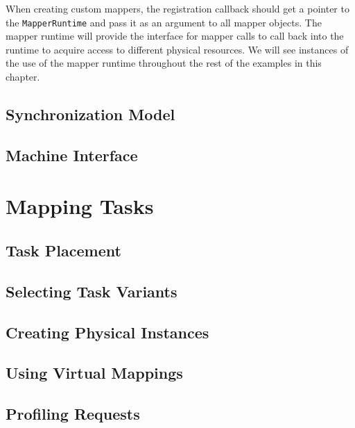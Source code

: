 When creating custom mappers, the registration callback should get a pointer
to the {\tt MapperRuntime} and pass it as an argument to all mapper objects.
The mapper runtime will provide the interface for mapper calls to call back
into the runtime to acquire access to different physical resources. We 
will see instances of the use of the mapper runtime throughout the rest of
the examples in this chapter.

\subsection{Synchronization Model}
\label{subsec:mapping:sync}

\subsection{Machine Interface}
\label{subsec:mapping:machine}



\section{Mapping Tasks}
\label{sec:mapping:tasks}

\subsection{Task Placement}
\label{subsec:mapping:placement}

\subsection{Selecting Task Variants}
\label{subsec:mapping:variants}

\subsection{Creating Physical Instances}
\label{subsec:mapping:instances}

\subsection{Using Virtual Mappings}
\label{subsec:mapping:virtual}

\subsection{Profiling Requests}
\label{subsec:mapping:profiling}

